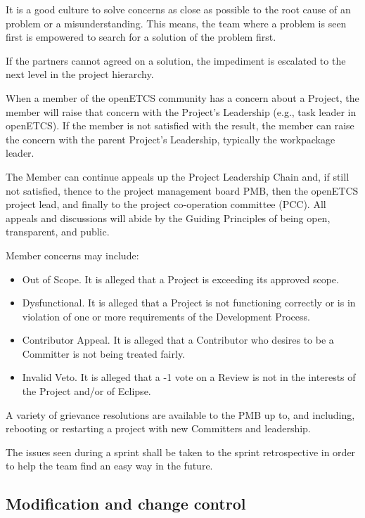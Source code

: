 \documentclass{template/openetcs_article}
\begin{document}
It is a good culture to solve concerns as close as possible to the root cause of an problem or a misunderstanding. This means, the team where a problem is seen first is empowered to search for a solution of the problem first.

If the partners cannot agreed on a solution, the impediment is escalated to the next level in the project hierarchy. 

When a member of the openETCS community has a concern about a Project, the  member will raise that concern with the Project's Leadership (e.g., task leader in openETCS). If the member is not satisfied with the result, the member can raise the concern with the parent Project's Leadership, typically the workpackage leader.

The Member can continue appeals up the Project Leadership Chain and, if still not satisfied, thence to the project management board PMB, then the openETCS project lead, and finally to the project co-operation committee (PCC). All appeals and discussions will abide by the Guiding Principles of being open, transparent, and public.

Member concerns may include:
\begin {itemize}
\item Out of Scope. It is alleged that a Project is exceeding its approved scope.

\item Dysfunctional. It is alleged that a Project is not functioning correctly or is in violation of one or more requirements of the Development Process.\

\item Contributor Appeal. It is alleged that a Contributor who desires to be a Committer is not being treated fairly.

\item Invalid Veto. It is alleged that a -1 vote on a Review is not in the interests of the Project and/or of Eclipse.
\end{itemize}

A variety of grievance resolutions are available to the PMB up to, and including, rebooting or restarting a project with new Committers and leadership.

The issues seen during a sprint shall be taken to the sprint retrospective in order to help the team find an easy way in the future.

\subsection{Modification and change control }
\end{document}
